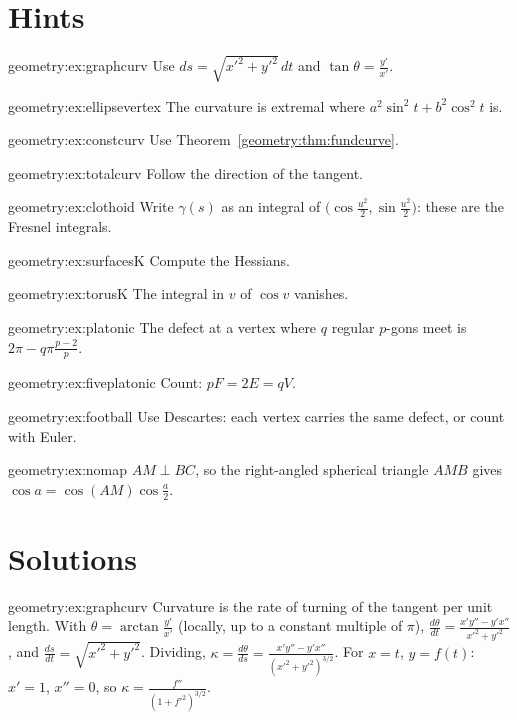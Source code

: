 \section{Hints}

\begin{hint}{geometry:ex:graphcurv}
Use $ds=\sqrt{x'^2+y'^2}\,dt$ and $\tan\theta=\frac{y'}{x'}$.
\end{hint}
\begin{hint}{geometry:ex:ellipsevertex}
The curvature is extremal where $a^2\sin^2t+b^2\cos^2t$ is.
\end{hint}
\begin{hint}{geometry:ex:constcurv}
Use Theorem~\ref{geometry:thm:fundcurve}.
\end{hint}
\begin{hint}{geometry:ex:totalcurv}
Follow the direction of the tangent.
\end{hint}
\begin{hint}{geometry:ex:clothoid}
Write $\gamma(s)$ as an integral of $\bigl(\cos\frac{u^2}2,\sin\frac{u^2}2\bigr)$: these are the Fresnel integrals.
\end{hint}
\begin{hint}{geometry:ex:surfacesK}
Compute the Hessians.
\end{hint}
\begin{hint}{geometry:ex:torusK}
The integral in $v$ of $\cos v$ vanishes.
\end{hint}
\begin{hint}{geometry:ex:platonic}
The defect at a vertex where $q$ regular $p$-gons meet is $2\pi-q\pi\frac{p-2}p$.
\end{hint}
\begin{hint}{geometry:ex:fiveplatonic}
Count: $pF=2E=qV$.
\end{hint}
\begin{hint}{geometry:ex:football}
Use Descartes: each vertex carries the same defect, or count with Euler.
\end{hint}
\begin{hint}{geometry:ex:nomap}
$AM\perp BC$, so the right-angled spherical triangle $AMB$ gives $\cos a=\cos(AM)\cos\frac a2$.
\end{hint}

\section{Solutions}

\begin{solution}{geometry:ex:graphcurv}
\idea Curvature is the rate of turning of the tangent per unit length.
\writeup With $\theta=\arctan\frac{y'}{x'}$ (locally, up to a constant multiple of $\pi$), $\frac{d\theta}{dt}=\frac{x'y''-y'x''}{x'^2+y'^2}$, and $\frac{ds}{dt}=\sqrt{x'^2+y'^2}$.
Dividing, $\kappa=\frac{d\theta}{ds}=\frac{x'y''-y'x''}{(x'^2+y'^2)^{3/2}}$. For $x=t$, $y=f(t)$: $x'=1$, $x''=0$, so $\kappa=\frac{f''}{(1+f'^2)^{3/2}}$.
\end{solution}

